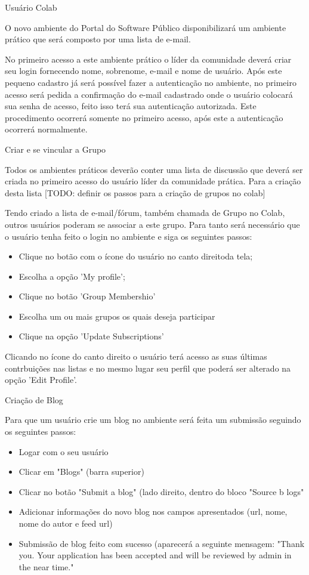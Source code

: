Usuário Colab

O novo ambiente do Portal do Software Público disponibilizará um ambiente prático
que será composto por uma lista de e-mail.

No primeiro acesso a este ambiente prático o líder da comunidade deverá criar seu
login fornecendo nome, sobrenome, e-mail e nome de usuário. Após este pequeno 
cadastro já será possível fazer a autenticação no ambiente, no primeiro acesso
será pedida a confirmação do e-mail cadastrado onde o usuário colocará sua senha 
de acesso, feito isso terá sua autenticação autorizada. Este procedimento ocorrerá 
somente no primeiro acesso, após este a autenticação ocorrerá normalmente.

Criar e se vincular a Grupo

Todos os ambientes práticos deverão conter uma lista de discussão que deverá ser criada
no primeiro acesso do usuário líder da comunidade prática. Para a criação desta lista
[TODO: definir os passos para a criação de grupos no  colab]

Tendo criado a lista de e-mail/fórum, também chamada de Grupo no Colab, outros
usuários poderam se associar a este grupo. Para tanto será necessário que o 
usuário tenha feito o login no ambiente e siga os seguintes passos:

\begin{itemize}
\item Clique no botão com o ícone do usuário no canto direitoda tela; 
\item Escolha a opção 'My profile';
\item Clique no botão 'Group Membershio'
\item Escolha um ou mais grupos os quais deseja participar
\item Clique na opção 'Update Subscriptions'
\end{itemize}

Clicando no ícone do canto direito o usuário terá acesso as suas últimas contrbuições
nas listas e no mesmo lugar seu perfil que poderá ser alterado na opção 'Edit Profile'.

Criação de Blog

Para que um usuário crie um blog no ambiente será feita um submissão seguindo os 
seguintes passos:

\begin{itemize}
\item Logar com o seu usuário
\item Clicar em "Blogs" (barra superior)
\item Clicar no botão "Submit a blog" (lado direito, dentro do bloco "Source b
logs"
\item Adicionar informações do novo blog nos campos apresentados (url, nome, 
nome do autor e feed url)
\item Submissão de blog feito com sucesso (aparecerá a seguinte mensagem: 
"Thank you. Your application has been accepted and will be reviewed by admin 
in the near time."
\end{itemize}

